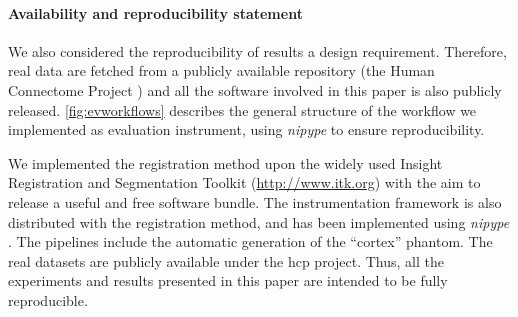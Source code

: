 \paragraph*{Availability and reproducibility statement}
{\color{red} We also considered the reproducibility of results a design requirement.
Therefore, real data are fetched from a publicly available repository
  (the Human Connectome Project \citep{essen_human_2012}) and all the software
  involved in this paper is also publicly released.
\autoref{fig:evworkflows} describes the general structure of the workflow we implemented
  as evaluation instrument, using \emph{nipype} \citep{gorgolewski_nipype_2011} to ensure
  reproducibility.

We implemented the registration method upon the widely used Insight Registration and Segmentation
	Toolkit (\url{http://www.itk.org}) with the aim to release a useful and free software bundle.
The instrumentation framework is also distributed with the registration method,
  and has been implemented using \emph{nipype} \citep{gorgolewski_nipype_2011}.
The pipelines include the automatic generation of the ``cortex'' phantom.
The real datasets are publicly available under the \gls*{hcp} project.
Thus, all the experiments and results presented in this paper are intended to be
  fully reproducible.}